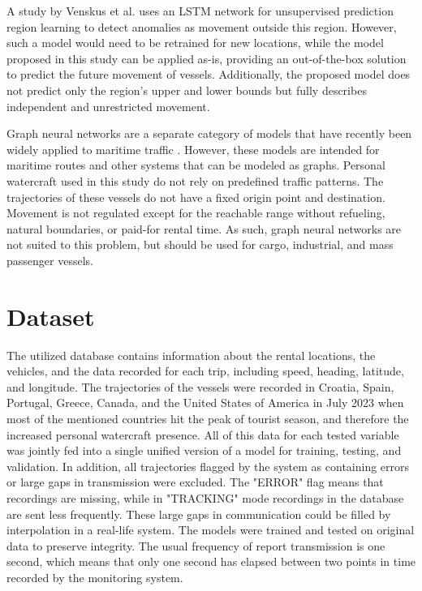 \documentclass[preprint,12pt]{elsarticle}
\begin{document}
A study by Venskus et al. \cite{venskus2021unsupervised} uses an LSTM network for unsupervised prediction region learning to detect anomalies as movement outside this region. However, such a model would need to be retrained for new locations, while the model proposed in this study can be applied as-is, providing an out-of-the-box solution to predict the future movement of vessels. Additionally, the proposed model does not predict only the region's upper and lower bounds but fully describes independent and unrestricted movement.

Graph neural networks are a separate category of models that have recently been widely applied to maritime traffic \cite{jiang2022graph, jiang2023graph}. However, these models are intended for maritime routes and other systems that can be modeled as graphs. Personal watercraft used in this study do not rely on predefined traffic patterns. The trajectories of these vessels do not have a fixed origin point and destination. Movement is not regulated except for the reachable range without refueling, natural boundaries, or paid-for rental time. As such, graph neural networks are not suited to this problem, but should be used for cargo, industrial, and mass passenger vessels.

\section{Dataset}
\label{sec:Dataset}

The utilized database \cite{ototrakOtoTrakTrack} contains information about the rental locations, the vehicles, and the data recorded for each trip, including speed, heading, latitude, and longitude. The trajectories of the vessels were recorded in Croatia, Spain, Portugal, Greece, Canada, and the United States of America in July 2023 when most of the mentioned countries hit the peak of tourist season, and therefore the increased personal watercraft presence. All of this data for each tested variable was jointly fed into a single unified version of a model for training, testing, and validation. In addition, all trajectories flagged by the system as containing errors or large gaps in transmission were excluded. The "ERROR" flag means that recordings are missing, while in "TRACKING" mode recordings in the database are sent less frequently. These large gaps in communication could be filled by interpolation in a real-life system. The models were trained and tested on original data to preserve integrity.  The usual frequency of report transmission is one second, which means that only one second has elapsed between two points in time recorded by the monitoring system.
\end{document}
